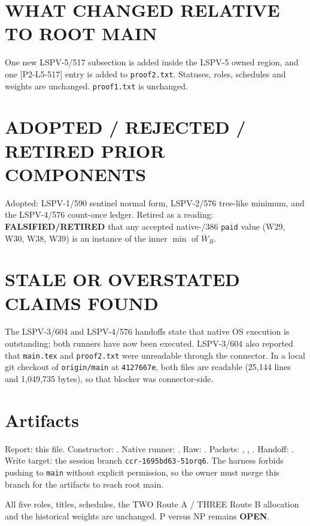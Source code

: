 \documentclass[11pt]{article}
\begin{document}
\section{WHAT CHANGED RELATIVE TO ROOT MAIN}
One new LSPV-5/517 subsection is added inside the LSPV-5 owned region, and one
[P2-L5-517] entry is added to \texttt{proof2.txt}. Statuses, roles, schedules and
weights are unchanged. \texttt{proof1.txt} is unchanged.

\section{ADOPTED / REJECTED / RETIRED PRIOR COMPONENTS}
Adopted: LSPV-1/590 sentinel normal form, LSPV-2/576 tree-like minimum, and the LSPV-4/576
count-once ledger.
Retired as a reading: \textbf{FALSIFIED/RETIRED} that any accepted native-/386
\texttt{paid} value (W29, W30, W38, W39) is an instance of the inner $\min$ of
$\overline W_R$.

\section{STALE OR OVERSTATED CLAIMS FOUND}
The LSPV-3/604 and LSPV-4/576 handoffs state that native OS execution is outstanding;
both runners have now been executed. LSPV-3/604 also reported that \texttt{main.tex} and
\texttt{proof2.txt} were unreadable through the connector. In a local git checkout of
\texttt{origin/main} at \texttt{4127667e}, both files are readable (25,144 lines and
1,049,735 bytes), so that blocker was connector-side.

\section{Artifacts}
Report: this file.
Constructor: .
Native runner: .
Raw: .
Packets: ,
, .
Handoff:
.
Write target: the session branch \texttt{ccr-1695bd63-51orq6}. The harness forbids
pushing to \texttt{main} without explicit permission, so the owner must merge this
branch for the artifacts to reach root main.

All five roles, titles, schedules, the TWO Route A / THREE Route B allocation and the
historical weights are unchanged. P versus NP remains \textbf{OPEN}.

\end{document}
